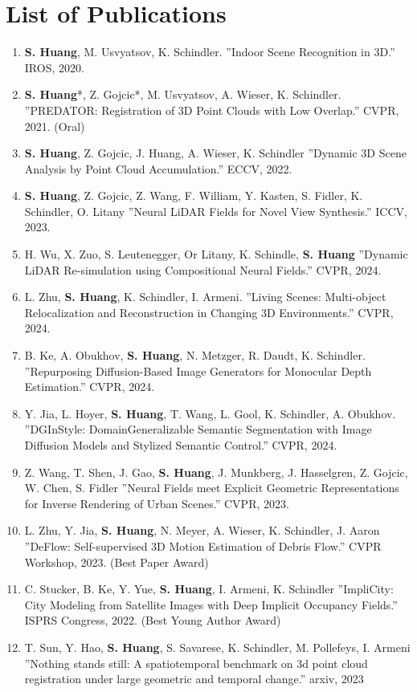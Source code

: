 
\chapter{List of Publications}

\begin{enumerate}
    \item \textbf{\textbf{S. Huang}}, M. Usvyatsov, K. Schindler. ”Indoor Scene Recognition in 3D.” IROS, 2020.
    \item \textbf{S. Huang}*, Z. Gojcic*, M. Usvyatsov, A. Wieser, K. Schindler. ”PREDATOR: Registration of 3D Point Clouds with Low Overlap.” CVPR, 2021. (Oral)
    \item \textbf{S. Huang}, Z. Gojcic, J. Huang, A. Wieser, K. Schindler ”Dynamic 3D Scene Analysis by Point Cloud Accumulation.” ECCV, 2022.
    \item \textbf{S. Huang}, Z. Gojcic, Z. Wang, F. William, Y. Kasten, S. Fidler, K. Schindler, O. Litany ”Neural LiDAR Fields for Novel View Synthesis.” ICCV, 2023.
    \item H. Wu, X. Zuo, S. Leutenegger, Or Litany, K. Schindle, \textbf{S. Huang} ”Dynamic LiDAR Re-simulation using Compositional Neural Fields.” CVPR, 2024.
    \item L. Zhu, \textbf{S. Huang}, K. Schindler, I. Armeni. ”Living Scenes: Multi-object Relocalization and Reconstruction in Changing 3D Environments.” CVPR, 2024.
    \item B. Ke, A. Obukhov, \textbf{S. Huang}, N. Metzger, R. Daudt, K. Schindler. ”Repurposing Diﬀusion-Based Image Generators for Monocular Depth Estimation.” CVPR, 2024.
    \item Y. Jia, L. Hoyer, \textbf{S. Huang}, T. Wang, L. Gool, K. Schindler, A. Obukhov. ”DGInStyle: DomainGeneralizable Semantic Segmentation with Image Diﬀusion Models and Stylized Semantic Control.” CVPR, 2024.
    \item Z. Wang, T. Shen, J. Gao, \textbf{S. Huang}, J. Munkberg, J. Hasselgren, Z. Gojcic, W. Chen, S. Fidler ”Neural Fields meet Explicit Geometric Representations for Inverse Rendering of Urban Scenes.” CVPR, 2023.
    \item L. Zhu, Y. Jia, \textbf{S. Huang}, N. Meyer, A. Wieser, K. Schindler, J. Aaron ”DeFlow: Self-supervised 3D Motion Estimation of Debris Flow.” CVPR Workshop, 2023. (Best Paper Award)
    \item C. Stucker, B. Ke, Y. Yue, \textbf{S. Huang}, I. Armeni, K. Schindler ”ImpliCity: City Modeling from Satellite Images with Deep Implicit Occupancy Fields.” ISPRS Congress, 2022. (Best Young Author Award)
    \item T. Sun, Y. Hao, \textbf{S. Huang}, S. Savarese, K. Schindler, M. Pollefeys, I. Armeni ”Nothing stands still: A spatiotemporal benchmark on 3d point cloud registration under large geometric and temporal change.” arxiv, 2023
\end{enumerate}